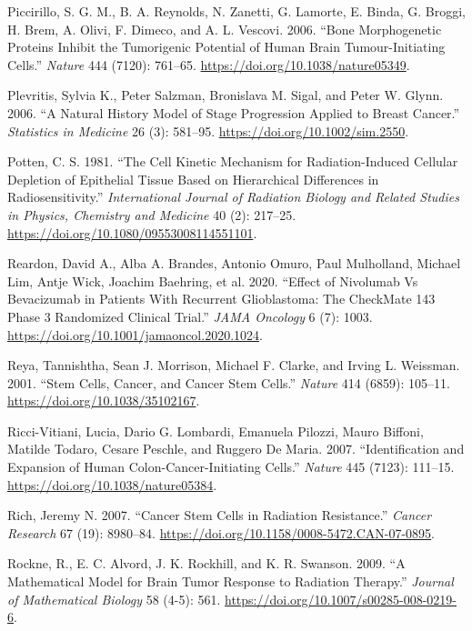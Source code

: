 \documentclass[
  letterpaper,
]{scrreprt}
\newlength{\cslhangindent}
\newenvironment{CSLReferences}[2] %
 {\begin{list}{}{%
  \setlength{\itemindent}{0pt}
  \setlength{\leftmargin}{0pt}
  \setlength{\parsep}{0pt}
  \ifodd #1
   \setlength{\leftmargin}{\cslhangindent}
   \setlength{\itemindent}{-1\cslhangindent}
  \fi
  \setlength{\itemsep}{#2\baselineskip}}}
 {\end{list}}
\theoremstyle{definition}
\theoremstyle{remark}
\begin{document}
\begin{CSLReferences}{1}{0}
Piccirillo, S. G. M., B. A. Reynolds, N. Zanetti, G. Lamorte, E. Binda,
G. Broggi, H. Brem, A. Olivi, F. Dimeco, and A. L. Vescovi. 2006.
{``Bone Morphogenetic Proteins Inhibit the Tumorigenic Potential of
Human Brain Tumour-Initiating Cells.''} \emph{Nature} 444 (7120):
761--65. \url{https://doi.org/10.1038/nature05349}.

Plevritis, Sylvia K., Peter Salzman, Bronislava M. Sigal, and Peter W.
Glynn. 2006. {``A Natural History Model of Stage Progression Applied to
Breast Cancer.''} \emph{Statistics in Medicine} 26 (3): 581--95.
\url{https://doi.org/10.1002/sim.2550}.

Potten, C. S. 1981. {``The Cell Kinetic Mechanism for Radiation-Induced
Cellular Depletion of Epithelial Tissue Based on Hierarchical
Differences in Radiosensitivity.''} \emph{International Journal of
Radiation Biology and Related Studies in Physics, Chemistry and
Medicine} 40 (2): 217--25.
\url{https://doi.org/10.1080/09553008114551101}.

Reardon, David A., Alba A. Brandes, Antonio Omuro, Paul Mulholland,
Michael Lim, Antje Wick, Joachim Baehring, et al. 2020. {``Effect of
Nivolumab Vs Bevacizumab in Patients With Recurrent Glioblastoma: The
CheckMate 143 Phase 3 Randomized Clinical Trial.''} \emph{JAMA Oncology}
6 (7): 1003. \url{https://doi.org/10.1001/jamaoncol.2020.1024}.

Reya, Tannishtha, Sean J. Morrison, Michael F. Clarke, and Irving L.
Weissman. 2001. {``Stem Cells, Cancer, and Cancer Stem Cells.''}
\emph{Nature} 414 (6859): 105--11.
\url{https://doi.org/10.1038/35102167}.

Ricci-Vitiani, Lucia, Dario G. Lombardi, Emanuela Pilozzi, Mauro
Biffoni, Matilde Todaro, Cesare Peschle, and Ruggero De Maria. 2007.
{``Identification and Expansion of Human Colon-Cancer-Initiating
Cells.''} \emph{Nature} 445 (7123): 111--15.
\url{https://doi.org/10.1038/nature05384}.

Rich, Jeremy N. 2007. {``Cancer Stem Cells in Radiation Resistance.''}
\emph{Cancer Research} 67 (19): 8980--84.
\url{https://doi.org/10.1158/0008-5472.CAN-07-0895}.

Rockne, R., E. C. Alvord, J. K. Rockhill, and K. R. Swanson. 2009. {``A
Mathematical Model for Brain Tumor Response to Radiation Therapy.''}
\emph{Journal of Mathematical Biology} 58 (4-5): 561.
\url{https://doi.org/10.1007/s00285-008-0219-6}.


\end{CSLReferences}
\end{document}
